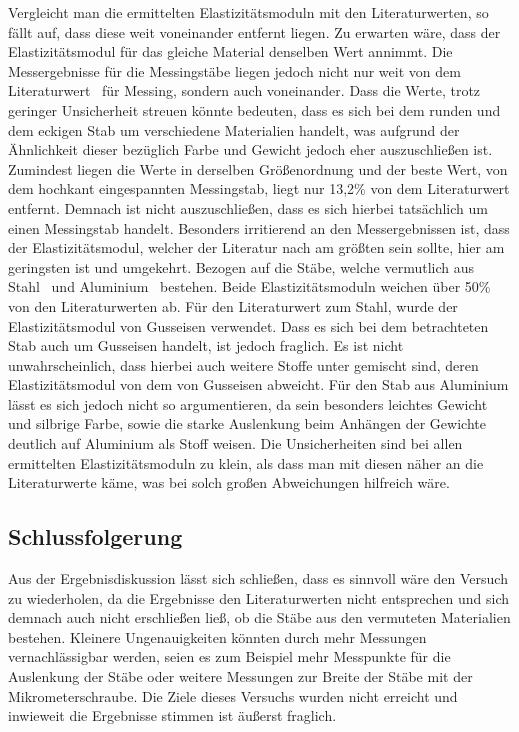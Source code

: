 	Vergleicht man die ermittelten Elastizitätsmoduln mit den Literaturwerten, so fällt auf, dass diese weit voneinander entfernt liegen.
	Zu erwarten wäre, dass der Elastizitätsmodul für das gleiche Material denselben Wert annimmt. Die Messergebnisse für die Messingstäbe liegen jedoch nicht nur weit von dem Literaturwert~\cite{1} für Messing, sondern auch voneinander. Dass die Werte, trotz geringer Unsicherheit streuen könnte bedeuten, dass es sich bei dem runden und dem eckigen Stab um verschiedene Materialien handelt, was aufgrund der Ähnlichkeit dieser bezüglich Farbe und Gewicht jedoch eher auszuschließen ist. Zumindest liegen die Werte in derselben Größenordnung und der \glqq beste\grqq {} Wert, von dem hochkant eingespannten Messingstab, liegt nur 13,2\% von dem Literaturwert entfernt. Demnach ist nicht auszuschließen, dass es sich hierbei tatsächlich um einen Messingstab handelt.
	Besonders irritierend an den Messergebnissen ist, dass der Elastizitätsmodul, welcher der Literatur nach am größten sein sollte, hier am geringsten ist und umgekehrt. Bezogen auf die Stäbe, welche vermutlich aus Stahl~\cite{2} und Aluminium~\cite{3} bestehen. Beide Elastizitätsmoduln weichen über 50\% von den Literaturwerten ab. Für den Literaturwert zum Stahl, wurde der Elastizitätsmodul von Gusseisen verwendet. Dass es sich bei dem betrachteten Stab auch um Gusseisen handelt, ist jedoch fraglich. Es ist nicht unwahrscheinlich, dass hierbei auch weitere Stoffe unter gemischt sind, deren Elastizitätsmodul von dem von Gusseisen abweicht.
	Für den Stab aus Aluminium lässt es sich jedoch nicht so argumentieren, da sein besonders leichtes Gewicht und silbrige Farbe, sowie die starke Auslenkung beim Anhängen der Gewichte deutlich auf Aluminium als Stoff weisen.
	Die Unsicherheiten sind bei allen ermittelten Elastizitätsmoduln zu klein, als dass man mit diesen näher an die Literaturwerte käme, was bei solch großen Abweichungen hilfreich wäre.
	
	\subsection{Schlussfolgerung}
	
	Aus der Ergebnisdiskussion lässt sich schließen, dass es sinnvoll wäre den Versuch zu wiederholen, da die Ergebnisse den Literaturwerten nicht entsprechen und sich demnach auch nicht erschließen ließ, ob die Stäbe aus den vermuteten Materialien bestehen. Kleinere Ungenauigkeiten könnten durch mehr Messungen vernachlässigbar werden, seien es zum Beispiel mehr Messpunkte für die Auslenkung der Stäbe oder weitere Messungen zur Breite der Stäbe mit der Mikrometerschraube. Die Ziele dieses Versuchs wurden nicht erreicht und inwieweit die Ergebnisse stimmen ist äußerst fraglich. 